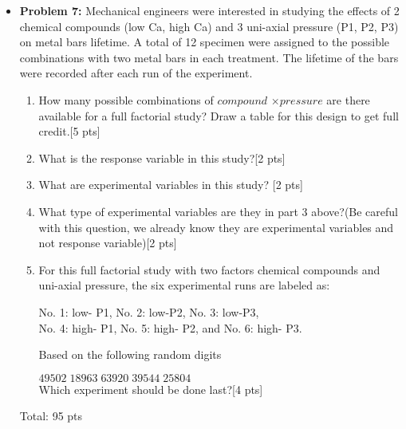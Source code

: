 \documentclass[11pt]{article}\usepackage[]{graphicx}\usepackage[]{color}
\begin{document}
\begin{itemize}
\item \textbf{Problem 7:} Mechanical engineers were interested in studying the effects of 2 chemical compounds 
	(low Ca, high Ca) and 3 uni-axial pressure (P1, P2, P3) on metal bars lifetime. A total of 12 specimen were assigned to the possible combinations with two metal bars in each treatment. The lifetime of the bars were recorded after each run of the experiment. 
\begin{enumerate}
	\item How many possible combinations of $compound$ $\times{ pressure}$ are there available for a full factorial study? Draw a table for this design to get full credit.[5 pts]
	\item What is the response variable in this study?[2 pts]
	\item What are experimental variables in this study? [2 pts]
	\item What type of experimental variables are they in part 3 above?(Be careful with this question, we already know they are experimental variables and not response variable)[2 pts]
	\item For this full factorial study with two factors chemical compounds and uni-axial pressure, the six experimental runs are labeled as:
	
	No. 1:  low- P1, \hspace{0.5cm} No. 2:  low-P2,
	\hspace{0.5cm} No. 3: low-P3, \\  No. 4:  high- P1,
	\hspace{0.5cm} No. 5:  high- P2, \hspace{0.1 cm}and
	\hspace{0.1cm} No. 6:  high- P3.
	
	\noindent Based on the following random digits
	
	\hspace{3.5cm}$49502 \; 18963 \; 63920 \; 39544 \; 25804$\\
	Which experiment should be done last?[4 pts]
\end{enumerate}


	
Total: 95 pts


















\end{itemize}
\end{document}
